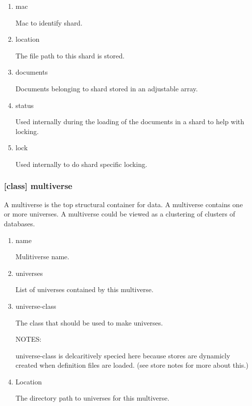 \documentclass[11pt]{article}
\begin{document}
\begin{enumerate}
\item\relax [accessor] mac
\label{sec:orgd18eb7b}

Mac to identify shard.

\item\relax [accessor] location
\label{sec:orgef58fa1}

The file path to this shard is stored.

\item\relax [accessor] documents
\label{sec:orgef098ea}

Documents belonging to shard stored in an adjustable array.

\item\relax [accessor] status
\label{sec:org062f54e}

Used internally during the loading of the documents in a shard to help with locking.

\item\relax [accessor] lock
\label{sec:org9211506}

Used internally to do shard specific locking.
\end{enumerate}

\subsubsection{[class] multiverse}
\label{sec:orge51a8ab}

A multiverse is the top structural container for data. A multiverse
contains one or more universes. A multiverse could be viewed as a clustering of clusters of
databases.

\begin{enumerate}
\item\relax [accessor] name
\label{sec:org5dd19f3}

Mulitiverse name.

\item\relax [accessor] universes
\label{sec:org2bfe640}

List of universes contained by this multiverse.

\item\relax [accessor] universe-class
\label{sec:org432e866}

The class that should be used to make universes.

NOTES:

universe-class is delcaritively specied here because stores are
dynamicly created when definition files are loaded. (see store notes
for more about this.)

\item\relax [accessor] Location
\label{sec:org6ead46c}

The directory path to universes for this multiverse.
\end{enumerate}
\end{document}
